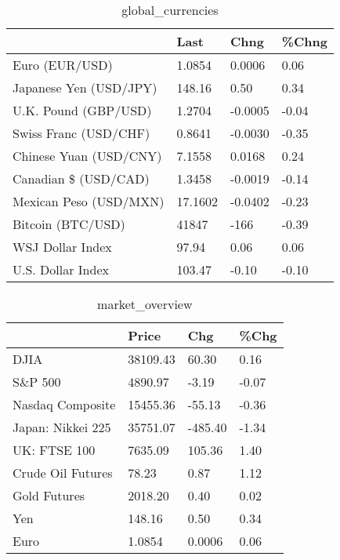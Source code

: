 \documentclass{article}%
\begin{document}
%


\begin{table}[htbp]%
\caption{global\_currencies}%
\centering%
\begin{adjustbox}{width=1\textwidth}%
\begin{tabular}{llll}
\toprule
                       &    Last &    Chng & \%Chng \\
\midrule
        Euro (EUR/USD) &  1.0854 &  0.0006 &  0.06 \\
Japanese Yen (USD/JPY) &  148.16 &    0.50 &  0.34 \\
  U.K. Pound (GBP/USD) &  1.2704 & -0.0005 & -0.04 \\
 Swiss Franc (USD/CHF) &  0.8641 & -0.0030 & -0.35 \\
Chinese Yuan (USD/CNY) &  7.1558 &  0.0168 &  0.24 \\
  Canadian \$ (USD/CAD) &  1.3458 & -0.0019 & -0.14 \\
Mexican Peso (USD/MXN) & 17.1602 & -0.0402 & -0.23 \\
     Bitcoin (BTC/USD) &   41847 &    -166 & -0.39 \\
      WSJ Dollar Index &   97.94 &    0.06 &  0.06 \\
     U.S. Dollar Index &  103.47 &   -0.10 & -0.10 \\
\bottomrule
\end{tabular}
%
\end{adjustbox}%
\end{table}

%


\begin{table}[htbp]%
\caption{market\_overview}%
\centering%
\begin{adjustbox}{width=1\textwidth}%
\begin{tabular}{llll}
\toprule
                  &    Price &     Chg &  \%Chg \\
\midrule
             DJIA & 38109.43 &   60.30 &  0.16 \\
          S\&P 500 &  4890.97 &   -3.19 & -0.07 \\
 Nasdaq Composite & 15455.36 &  -55.13 & -0.36 \\
Japan: Nikkei 225 & 35751.07 & -485.40 & -1.34 \\
     UK: FTSE 100 &  7635.09 &  105.36 &  1.40 \\
Crude Oil Futures &    78.23 &    0.87 &  1.12 \\
     Gold Futures &  2018.20 &    0.40 &  0.02 \\
              Yen &   148.16 &    0.50 &  0.34 \\
             Euro &   1.0854 &  0.0006 &  0.06 \\
\bottomrule
\end{tabular}
%
\end{adjustbox}%
\end{table}

%
\end{document}
